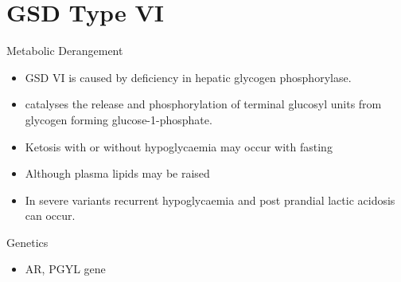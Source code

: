 \documentclass[presentation, smaller]{beamer}
\begin{document}
\section{GSD Type VI}
\label{sec:org39f9c64}
\begin{frame}[label={sec:org0b99635}]{Metabolic Derangement}
\begin{itemize}
\item GSD VI is caused by deficiency in hepatic glycogen phosphorylase.
\item catalyses the release and phosphorylation of terminal glucosyl units
from glycogen forming glucose-1-phosphate.
\item Ketosis with or without hypoglycaemia may occur with fasting
\item Although plasma lipids may be raised
\item In severe variants recurrent hypoglycaemia and post prandial lactic
acidosis can occur.
\end{itemize}
\end{frame}
\begin{frame}[label={sec:org491dc0b}]{Genetics}
\begin{itemize}
\item AR, PGYL gene
\end{itemize}
\end{frame}
\end{document}
